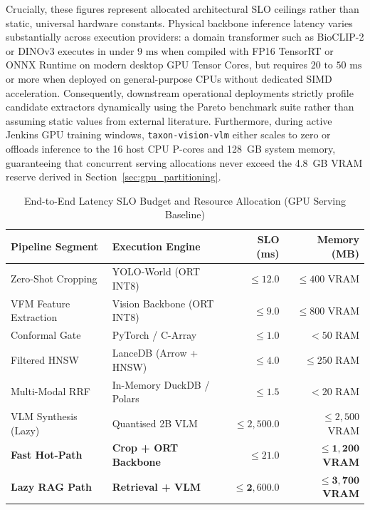 Crucially, these figures represent allocated architectural SLO ceilings rather than static, universal hardware constants. Physical backbone inference latency varies substantially across execution providers: a domain transformer such as BioCLIP-2 or DINOv3 executes in under $9\text{ ms}$ when compiled with FP16 TensorRT or ONNX Runtime on modern desktop GPU Tensor Cores, but requires $20\text{ to }50\text{ ms}$ or more when deployed on general-purpose CPUs without dedicated SIMD acceleration. Consequently, downstream operational deployments strictly profile candidate extractors dynamically using the Pareto benchmark suite rather than assuming static values from external literature. Furthermore, during active Jenkins GPU training windows, \texttt{taxon-vision-vlm} either scales to zero or offloads inference to the 16 host CPU P-cores and 128~GB system memory, guaranteeing that concurrent serving allocations never exceed the 4.8~GB VRAM reserve derived in Section~\ref{sec:gpu_partitioning}.

\begin{table}[htbp]
\centering
\small
\caption{End-to-End Latency SLO Budget and Resource Allocation (GPU Serving Baseline)}
\label{tab:rag_latency}
\begin{tabularx}{\textwidth}{@{} >{\raggedright\arraybackslash}X >{\raggedright\arraybackslash}X r r @{}}
\toprule
\textbf{Pipeline Segment} & \textbf{Execution Engine} & \textbf{SLO (ms)} & \textbf{Memory (MB)} \\
\midrule
Zero-Shot Cropping & YOLO-World (ORT INT8) & $\le 12.0$ & $\le 400$ VRAM \\
VFM Feature Extraction & Vision Backbone (ORT INT8) & $\le 9.0$ & $\le 800$ VRAM \\
Conformal Gate & PyTorch / C-Array & $\le 1.0$ & $< 50$ RAM \\
Filtered HNSW & LanceDB (Arrow + HNSW) & $\le 4.0$ & $\le 250$ RAM \\
Multi-Modal RRF & In-Memory DuckDB / Polars & $\le 1.5$ & $< 20$ RAM \\
VLM Synthesis (Lazy) & Quantised 2B VLM & $\le 2{,}500.0$ & $\le 2{,}500$ VRAM \\
\midrule
\textbf{Fast Hot-Path} & \textbf{Crop + ORT Backbone} & $\mathbf{\le 21.0}$ & $\mathbf{\le 1{,}200}$ \textbf{VRAM} \\
\textbf{Lazy RAG Path} & \textbf{Retrieval + VLM} & $\mathbf{\le 2{,}600.0}$ & $\mathbf{\le 3{,}700}$ \textbf{VRAM} \\
\bottomrule
\end{tabularx}
\end{table}
